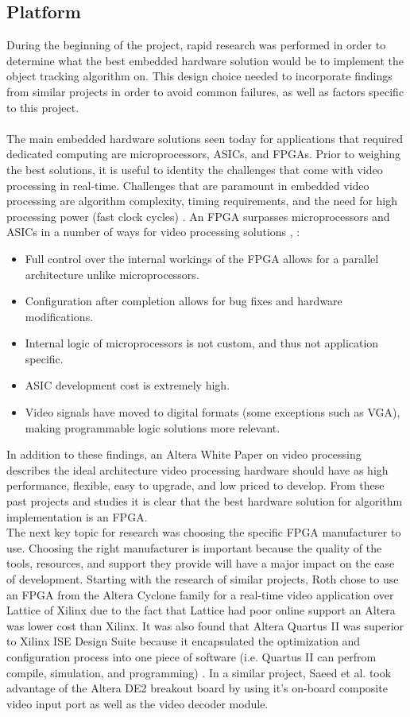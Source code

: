 \documentclass[12pt]{article} %
\begin{document}
\subsection{Platform}
\label{sec:platform}
During the beginning of the project, rapid research was performed in order to determine what the best embedded hardware solution would be to implement the object tracking algorithm on. This design choice needed to incorporate findings from similar projects in order to avoid common failures, as well as factors specific to this project. \\\\
The main embedded hardware solutions seen today for applications that required dedicated computing are microprocessors, ASICs, and FPGAs. Prior to weighing the best solutions, it is useful to identity the challenges that come with video processing in real-time. Challenges that are paramount in embedded video processing are algorithm complexity, timing requirements, and the need for high processing power (fast clock cycles) \cite{2}.  An FPGA surpasses microprocessors and ASICs in a number of ways for video processing  solutions \cite{1}, \cite{2}:
\begin{itemize}
\item Full control over the internal workings of the FPGA allows for a parallel architecture unlike microprocessors.
\item Configuration after completion allows for bug fixes and hardware modifications.
\item Internal logic of microprocessors is not custom, and thus not application specific.
\item ASIC development cost is extremely high.
\item Video signals have moved to digital formats (some exceptions such as VGA), making programmable logic solutions more relevant.
\end{itemize}
In addition to these findings, an Altera White Paper \cite{3} on video processing describes the ideal architecture video processing hardware should have as high performance, flexible, easy to upgrade, and low priced to develop. From these past projects and studies it is clear that the best hardware solution for algorithm implementation is an FPGA. \\
The next key topic for research was choosing the specific FPGA manufacturer to use. Choosing the right manufacturer is important because the quality of the tools, resources, and support they provide will have a major impact on the ease of development. Starting with the research of similar projects, Roth \cite{1} chose to use an FPGA from the Altera Cyclone family for a real-time video application over Lattice of Xilinx due to the fact that Lattice had poor online support an Altera was lower cost than Xilinx. It was also found that Altera Quartus II was superior to Xilinx ISE Design Suite because it encapsulated the optimization and configuration process into one piece of software (i.e. Quartus II can perfrom compile, simulation, and programming) \cite{1}. In a similar project, Saeed et al. \cite{2} took advantage of the Altera DE2 breakout board by using it's on-board composite video input port as well as the video decoder module. \\\\
\end{document}

